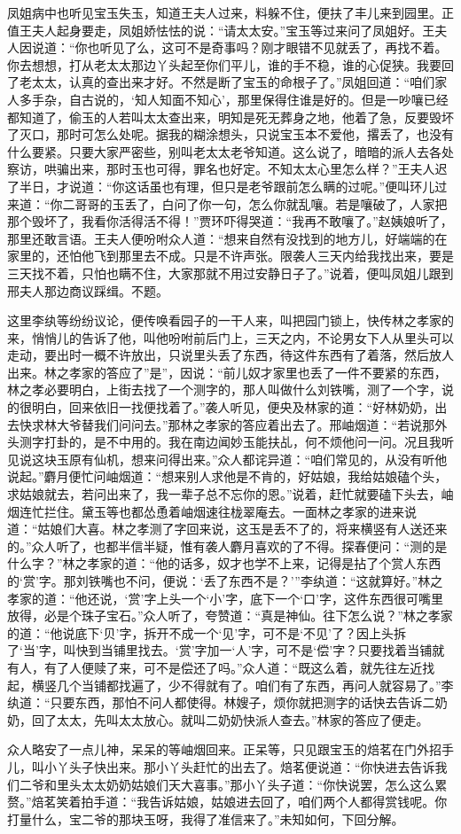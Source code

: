 \begin{parag}
    凤姐病中也听见宝玉失玉，知道王夫人过来，料躲不住，便扶了丰儿来到园里。正值王夫人起身要走，凤姐娇怯怯的说：“请太太安。”宝玉等过来问了凤姐好。王夫人因说道：“你也听见了么，这可不是奇事吗？刚才眼错不见就丢了，再找不着。你去想想，打从老太太那边丫头起至你们平儿，谁的手不稳，谁的心促狭。我要回了老太太，认真的查出来才好。不然是断了宝玉的命根子了。”凤姐回道：“咱们家人多手杂，自古说的，‘知人知面不知心’，那里保得住谁是好的。但是一吵嚷已经都知道了，偷玉的人若叫太太查出来，明知是死无葬身之地，他着了急，反要毁坏了灭口，那时可怎么处呢。据我的糊涂想头，只说宝玉本不爱他，撂丢了，也没有什么要紧。只要大家严密些，别叫老太太老爷知道。这么说了，暗暗的派人去各处察访，哄骗出来，那时玉也可得，罪名也好定。不知太太心里怎么样？”王夫人迟了半日，才说道：“你这话虽也有理，但只是老爷跟前怎么瞒的过呢。”便叫环儿过来道：“你二哥哥的玉丢了，白问了你一句，怎么你就乱嚷。若是嚷破了，人家把那个毁坏了，我看你活得活不得！”贾环吓得哭道：“我再不敢嚷了。”赵姨娘听了，那里还敢言语。王夫人便吩咐众人道：“想来自然有没找到的地方儿，好端端的在家里的，还怕他飞到那里去不成。只是不许声张。限袭人三天内给我找出来，要是三天找不着，只怕也瞒不住，大家那就不用过安静日子了。”说着，便叫凤姐儿跟到邢夫人那边商议踩缉。不题。
\end{parag}


\begin{parag}
    这里李纨等纷纷议论，便传唤看园子的一干人来，叫把园门锁上，快传林之孝家的来，悄悄儿的告诉了他，叫他吩咐前后门上，三天之内，不论男女下人从里头可以走动，要出时一概不许放出，只说里头丢了东西，待这件东西有了着落，然后放人出来。林之孝家的答应了”是”，因说：“前儿奴才家里也丢了一件不要紧的东西，林之孝必要明白，上街去找了一个测字的，那人叫做什么刘铁嘴，测了一个字，说的很明白，回来依旧一找便找着了。”袭人听见，便央及林家的道：“好林奶奶，出去快求林大爷替我们问问去。”那林之孝家的答应着出去了。邢岫烟道：“若说那外头测字打卦的，是不中用的。我在南边闻妙玉能扶乩，何不烦他问一问。况且我听见说这块玉原有仙机，想来问得出来。”众人都诧异道：“咱们常见的，从没有听他说起。”麝月便忙问岫烟道：“想来别人求他是不肯的，好姑娘，我给姑娘磕个头，求姑娘就去，若问出来了，我一辈子总不忘你的恩。”说着，赶忙就要磕下头去，岫烟连忙拦住。黛玉等也都怂恿着岫烟速往栊翠庵去。一面林之孝家的进来说道：“姑娘们大喜。林之孝测了字回来说，这玉是丢不了的，将来横竖有人送还来的。”众人听了，也都半信半疑，惟有袭人麝月喜欢的了不得。探春便问：“测的是什么字？”林之孝家的道：“他的话多，奴才也学不上来，记得是拈了个赏人东西的‘赏’字。那刘铁嘴也不问，便说：‘丢了东西不是？’”李纨道：“这就算好。”林之孝家的道：“他还说，‘赏’字上头一个‘小’字，底下一个‘口’字，这件东西很可嘴里放得，必是个珠子宝石。”众人听了，夸赞道：“真是神仙。往下怎么说？”林之孝家的道：“他说底下‘贝’字，拆开不成一个‘见’字，可不是‘不见’了？因上头拆了‘当’字，叫快到当铺里找去。‘赏’字加一‘人’字，可不是‘偿’字？只要找着当铺就有人，有了人便赎了来，可不是偿还了吗。”众人道：“既这么着，就先往左近找起，横竖几个当铺都找遍了，少不得就有了。咱们有了东西，再问人就容易了。”李纨道：“只要东西，那怕不问人都使得。林嫂子，烦你就把测字的话快去告诉二奶奶，回了太太，先叫太太放心。就叫二奶奶快派人查去。”林家的答应了便走。
\end{parag}


\begin{parag}
    众人略安了一点儿神，呆呆的等岫烟回来。正呆等，只见跟宝玉的焙茗在门外招手儿，叫小丫头子快出来。那小丫头赶忙的出去了。焙茗便说道：“你快进去告诉我们二爷和里头太太奶奶姑娘们天大喜事。”那小丫头子道：“你快说罢，怎么这么累赘。”焙茗笑着拍手道：“我告诉姑娘，姑娘进去回了，咱们两个人都得赏钱呢。你打量什么，宝二爷的那块玉呀，我得了准信来了。”未知如何，下回分解。
\end{parag}